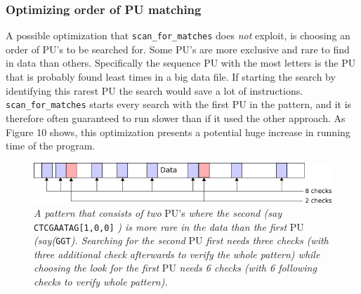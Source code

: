 \documentclass[12pt]{article}
\newcommand{\scm}{\texttt{scan\_for\_matches} }
\newcommand{\pu}{PU }
\newcommand{\pus}{PU's }
\begin{document}
\subsubsection{Optimizing order of \pu matching}
A possible optimization that \scm does \textit{not} exploit, is choosing an order of \pus to be searched for.
Some \pus are more exclusive and rare to find in data than others. Specifically the sequence \pu with the most
letters is the \pu that is probably found least times in a big data file. If starting the search by
identifying this rarest \pu the search would save a lot of instructions. \scm starts every search with the 
first \pu in the pattern, and it is therefore often guaranteed to run slower than if it used the other approach.
As Figure 10 shows, this optimization presents a potential huge increase in running time of the program. \newpage
\begin{figure}[H]
\begin{center}
\includegraphics[scale=0.8]{Diagrams/opti.png}
\end{center}
\caption{\textit{A pattern that consists of two} \pus \textit{where the second (say} \texttt{CTCGAATAG[1,0,0]}
\textit{) is more rare in the data than the first} \pu \textit{(say(}\texttt{GGT}\textit{). Searching for the 
second} \pu \textit{first needs three checks (with three additional check afterwards to verify the whole pattern)
while choosing the look for the first} \pu \textit{needs 6 checks (with 6 following checks to verify whole pattern).}}
\end{figure}
\end{document}
